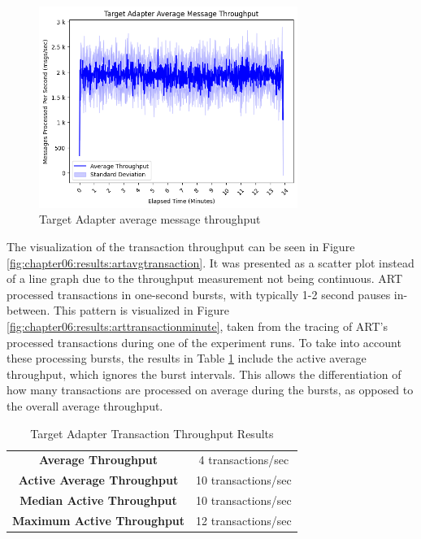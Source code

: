 \begin{figure}[htbp]
    \centering
    \includegraphics[width=0.75\textwidth]{chapters/images/art-performance/art-avg-message-throughput.png}
    \caption{Target Adapter average message throughput}
    \label{fig:chapter06:results:artavgmessage}
\end{figure}

The visualization of the transaction throughput can be seen in Figure \ref{fig:chapter06:results:artavgtransaction}. It was presented as a scatter plot instead of a line graph due to the throughput measurement not being continuous. \ac{ART} processed transactions in one-second bursts, with typically 1-2 second pauses in-between. This pattern is visualized in Figure \ref{fig:chapter06:results:arttransactionminute}, taken from the tracing of \ac{ART}'s processed transactions during one of the experiment runs. To take into account these processing bursts, the results in Table \ref{tab:art:transactionthroughput} include the active average throughput, which ignores the burst intervals. This allows the differentiation of how many transactions are processed on average during the bursts, as opposed to the overall average throughput.

\begin{table}
    \centering
    \begin{tabular}{|cc|}
        \hline
         \textbf{Average Throughput} & 4 transactions/sec \\
         \textbf{Active Average Throughput} & 10 transactions/sec \\
         \textbf{Median Active Throughput} & 10 transactions/sec \\
         \textbf{Maximum Active Throughput} & 12 transactions/sec \\
        \hline
    \end{tabular}
    \caption{Target Adapter Transaction Throughput Results}
    \label{tab:art:transactionthroughput}
\end{table}

